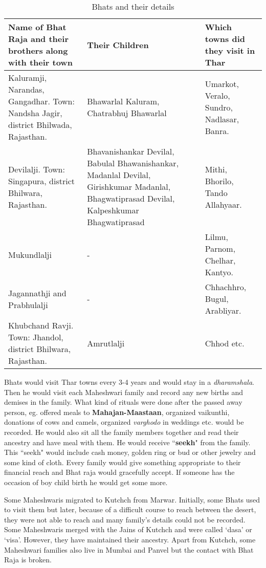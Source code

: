 \begin{table}
\begin{center}
\hspace*{-2cm}\begin{tabular}{p{5.5cm}|p{5.5cm}|p{5.5cm}}
\hline
\textbf{Name of Bhat Raja and their brothers along with their town} &
\textbf{Their Children} & \textbf{Which towns did they visit in Thar}\\
\hline
Kaluramji, Narandas, Gangadhar. Town: Nandsha Jagir, district Bhilwada, Rajasthan. &
Bhawarlal Kaluram, Chatrabhuj Bhawarlal &
Umarkot, Veralo, Sundro, Nadlasar, Banra.\\
\hline
Devilalji. Town: Singapura, district Bhilwara, Rajasthan. & Bhavanishankar Devilal, Babulal Bhawanishankar, Madanlal Devilal, Girishkumar Madanlal, Bhagwatiprasad Devilal, Kalpeshkumar Bhagwatiprasad &
Mithi, Bhorilo, Tando Allahyaar.\\
\hline
Mukundlalji &
- &
Lilmu, Parnom, Chelhar, Kantyo.\\
\hline
Jagannathji and Prabhulalji &
- &
Chhachhro, Bugul, Arabliyar.\\
\hline
Khubchand Ravji. Town: Jhandol, district Bhilwara, Rajasthan. &
Amrutlalji &
Chhod etc.\\
\hline
\end{tabular}
\end{center}
\caption{Bhats and their details}\label{tblbhats}
\end{table}
%
Bhats would visit Thar towns every 3-4 years and would stay in a
\textit{dharamshala}. Then he would visit each Maheshwari family and record any
new births and demises in the family. What kind of rituals were done after the
passed away person, eg. offered meals to \textbf{Mahajan-Maastaan}, organized
vaikunthi, donations of cows and camels, organized \textit{varghodo} in
weddings etc. would be recorded. He would also sit all the family members
together and read their ancestry and have meal with them. He would receive
``\textbf{seekh}" from the family. This ``seekh" would include cash money,
golden ring or bud or other jewelry and some kind of cloth. Every family would
give something appropriate to their financial reach and Bhat raja would
gracefully accept. If someone has the occasion of boy child birth he would get
some more.

Some Maheshwaris migrated to Kutchch from Marwar. Initially, some Bhats used to
visit them but later, because of a difficult course to reach between the
desert, they were not able to reach and many family's details could not be
recorded. Some Maheshwaris merged with the Jains of Kutchch and were called
`dasa' or `visa'. However, they have maintained their ancestry. Apart from
Kutchch, some Maheshwari families also live in Mumbai and Panvel but the
contact with Bhat Raja is broken.

